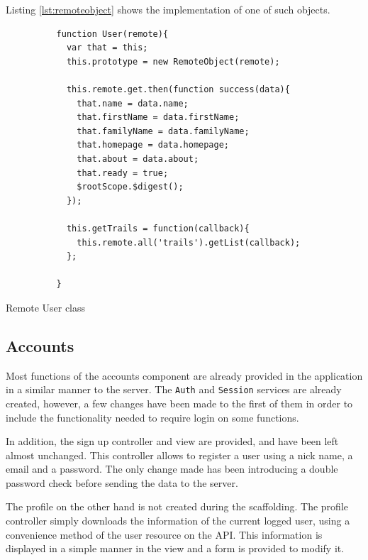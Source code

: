 Listing \ref{lst:remoteobject} shows the implementation of one of such objects.

\begin{listing}[ht]\centering
  \begin{minipage}{.85\textwidth}
    \begin{verbatim}
          function User(remote){
            var that = this;
            this.prototype = new RemoteObject(remote);
            
            this.remote.get.then(function success(data){
              that.name = data.name;
              that.firstName = data.firstName;
              that.familyName = data.familyName;
              that.homepage = data.homepage;
              that.about = data.about;
              that.ready = true;
              $rootScope.$digest();
            });
            
            this.getTrails = function(callback){
              this.remote.all('trails').getList(callback);
            };
            
          }
    \end{verbatim}
  \end{minipage}
  \caption{Remote User class}\label{lst:remoteobject}
\end{listing}

\subsection{Accounts}

Most functions of the accounts component are already provided in the application in a similar manner to the server. The \texttt{Auth} and \texttt{Session} services are already created, however, a few changes have been made to the first of them in order to include the functionality needed to require login on some functions.

In addition, the sign up controller and view are provided, and have been left almost unchanged. This controller allows to register a user using a nick name, a email and a password. The only change made has been introducing a double password check before sending the data to the server.

The profile on the other hand is not created during the scaffolding. The profile controller simply downloads the information of the current logged user, using a convenience method of the user resource on the API. This information is displayed in a simple manner in the view and a form is provided to modify it.

